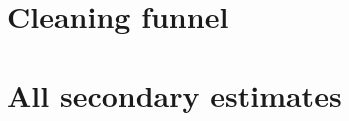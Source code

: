 \documentclass[sigconf,review=false,anonymous=false]{acmart}
\begin{document}



\appendix
\section{Cleaning funnel}

\begin{table}[h]
  \caption{Cleaning funnel per dataset.}
  \label{tab:funnel}
  \footnotesize
  
\end{table}

\section{All secondary estimates}

\begin{table}[h]
  \caption{All secondary estimates (fair, within-issue), with Benjamini--Hochberg $q$-values. Points per 100 attempts unless the outcome is a count.}
  \label{tab:secondary}
  \scriptsize
  \resizebox{\textwidth}{!}{}
\end{table}
\end{document}
